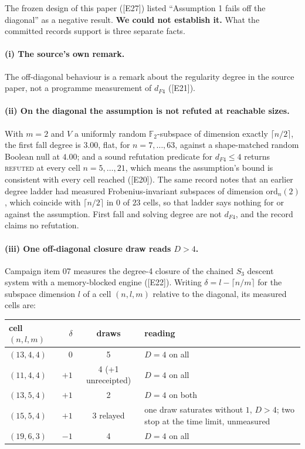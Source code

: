 \documentclass[10pt,a4paper]{article}
\newcommand{\FF}{\mathbb{F}}
\newcommand{\ev}[1]{\textup{[#1]}}
\theoremstyle{definition}
\theoremstyle{remark}
\begin{document}
The frozen design of this paper (\ev{E27}) listed ``Assumption 1 fails off the diagonal'' as a negative
result. \textbf{We could not establish it.} What the committed records support is
three separate facts.

\paragraph{(i) The source's own remark.}
The off-diagonal behaviour is a remark about the regularity degree in the source
paper, not a programme measurement of $d_{F4}$ (\ev{E21}).

\paragraph{(ii) On the diagonal the assumption is not refuted at reachable sizes.}
With $m=2$ and $V$ a uniformly random $\FF_2$-subspace of dimension exactly $\lceil n/2\rceil$,
the first fall degree is $3.00$, flat, for $n=7,\dots,63$, against a shape-matched
random Boolean null at $4.00$; and a sound refutation predicate for $d_{F4}\le4$
returns \textsc{refuted} at every cell $n=5,\dots,21$, which means the assumption's
bound is consistent with every cell reached (\ev{E20}). The same record notes that an
earlier degree ladder had measured Frobenius-invariant subspaces of dimension
$\mathrm{ord}_n(2)$, which coincide with $\lceil n/2\rceil$ in $0$ of $23$ cells, so
that ladder says nothing for or against the assumption. First fall and solving degree
are not $d_{F4}$, and the record claims no refutation.

\paragraph{(iii) One off-diagonal closure draw reads $D>4$.}
Campaign item 07 measures the degree-4 closure of the chained $S_3$ descent system
with a memory-blocked engine (\ev{E22}). Writing $\delta=l-\lceil n/m\rceil$ for the
subspace dimension $l$ of a cell $(n,l,m)$ relative to the diagonal, its measured
cells are:

\begin{center}\small
\begin{tabular}{@{}lrcp{7.4cm}@{}}
\toprule
cell $(n,l,m)$ & $\delta$ & draws & reading \\
\midrule
$(13,4,4)$ & $0$  & 5 & $D=4$ on all \\
$(11,4,4)$ & $+1$ & 4 (+1 unreceipted) & $D=4$ on all \\
$(13,5,4)$ & $+1$ & 2 & $D=4$ on both \\
$(15,5,4)$ & $+1$ & 3 relayed & one draw saturates without $1$, $D>4$; two stop at the time limit, unmeasured \\
$(19,6,3)$ & $-1$ & 4 & $D=4$ on all \\
\bottomrule
\end{tabular}
\end{center}
\end{document}
